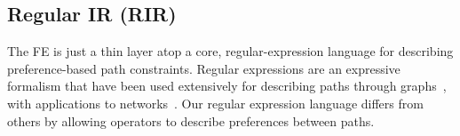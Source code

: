 \subsection{Regular IR (RIR)}
\label{sec:rir}

The \sysname FE is just a thin layer atop a core, regular-expression language for describing preference-based path constraints. Regular expressions are an expressive formalism that have been used extensively for describing paths through graphs~\cite{bib:todo}, with applications to networks~\cite{bib:todo}. Our regular expression language differs from others by allowing operators to describe preferences between paths.

\newcommand{\BNFALT}{\;\;|\;\;}
\newcommand{\hdr}[2]{\flushleft \chdr{#1}{#2}}
\newcommand{\chdr}[2]{\textbf{#1} {#2} \\ \centering}

